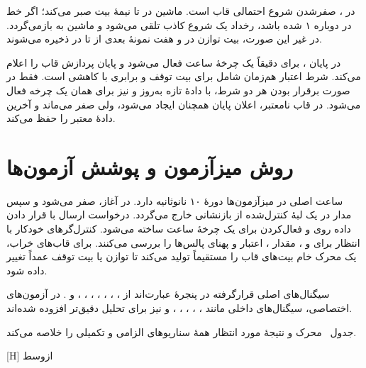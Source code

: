 در ، صفرشدن  شروع احتمالی قاب است. ماشین در  تا
نیمهٔ بیت صبر می‌کند؛ اگر خط در  دوباره ۱ شده باشد، رخداد یک شروع کاذب
تلقی می‌شود و ماشین به  بازمی‌گردد. در غیر این صورت، بیت توازن در
 و هفت نمونهٔ بعدی از  تا  در
 ذخیره می‌شوند.

در پایان ،  برای دقیقاً یک چرخهٔ ساعت فعال می‌شود و پایان
پردازش قاب را اعلام می‌کند. شرط اعتبار هم‌زمان شامل  برای بیت توقف و
برابری  با  کاهشی  است. فقط در صورت
برقرار بودن هر دو شرط،  با دادهٔ تازه به‌روز و  نیز
برای همان یک چرخه فعال می‌شود. در قاب نامعتبر، اعلان پایان همچنان ایجاد می‌شود، ولی
 صفر می‌ماند و  آخرین دادهٔ معتبر را حفظ می‌کند.


\section{روش میزآزمون و پوشش آزمون‌ها}

ساعت اصلی در میزآزمون‌ها دورهٔ ۱۰ نانوثانیه دارد. در آغاز،  صفر می‌شود و سپس
مدار در یک لبهٔ کنترل‌شده از بازنشانی خارج می‌گردد. درخواست ارسال با قرار دادن داده روی
 و فعال‌کردن  برای یک چرخهٔ ساعت ساخته می‌شود.
کنترل‌گرهای خودکار با انتظار برای  و ، مقدار
، اعتبار  و پهنای پالس‌ها را بررسی می‌کنند. برای
قاب‌های خراب، یک محرک خام  بیت‌های قاب را مستقیماً تولید می‌کند تا توازن یا بیت
توقف عمداً تغییر داده شود.

سیگنال‌های اصلی قرارگرفته در پنجرهٔ  عبارت‌اند از ، ،
، ، ، ، ،
 و . در آزمون‌های اختصاصی، سیگنال‌های داخلی
مانند ، ، ، ،
،  و  نیز برای تحلیل دقیق‌تر افزوده
شده‌اند.

جدول~ محرک و نتیجهٔ مورد انتظار همهٔ سناریوهای الزامی و تکمیلی را
خلاصه می‌کند.

[H]
‌ازوسط


